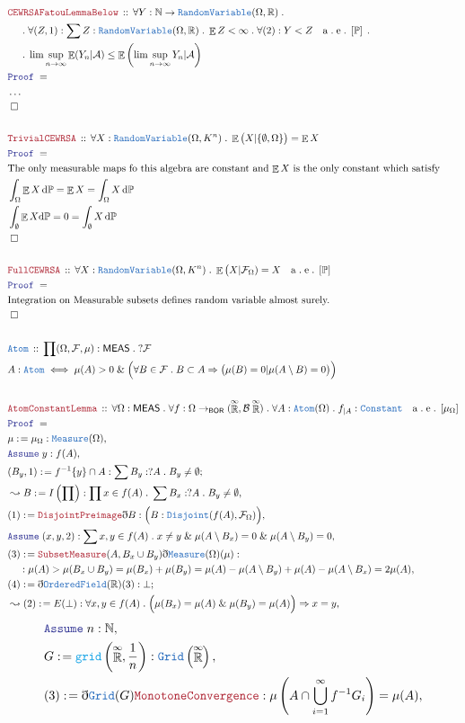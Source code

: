 \documentclass[12pt]{scrartcl}
\newcommand{\TYPE}[1]{\textcolor{NavyBlue}{\mathtt{#1}}}
\newcommand{\FUNC}[1]{\textcolor{Cerulean}{\mathtt{#1}}}
\newcommand{\LOGIC}[1]{\textcolor{Blue}{\mathtt{#1}}}
\newcommand{\THM}[1]{\textcolor{Maroon}{\mathtt{#1}}}
\renewcommand{\.}{\; . \;}
\newcommand{\de}{: \kern 0.1pc =}
\newcommand{\Theorem}[2]{& \THM{#1} \, :: \, #2 \\ & \Proof = \\ }
\newcommand{\DeclareType}[2]{& \TYPE{#1} \, :: \, #2 \\}
\newcommand{\DefineType}[3]{& #1 : \TYPE{#2} \iff #3 \\}
\newcommand{\NewLine}{\\ & \kern 1pc}
\newcommand{\Page}[1]{\begin{align*} #1 \end{align*}   }
\newcommand{ \bd }{ \ByDef }
\newcommand{\NoProof}{ & \ldots \\ \EndProof}
\renewcommand{\And}{\; \& \;}
\newcommand{\Reals}{\mathbb{R} }
\newcommand{\Nat}{\mathbb{N} }
\newcommand{\EReals}{\stackrel{\mathclap{\infty}}{\mathbb{R}}}
\newcommand{\Say}[3]{& #1 \de #2 : #3, \\}
\newcommand{\Conclude}[3]{& #1 \de #2 : #3; \\}
\newcommand{\Derive}[3]{& \leadsto #1 \de #2 : #3, \\}
\newcommand{\A}{\LOGIC{Assume} \;}
\newcommand{\Assume}[2]{& \A #1 : #2, \\}
\newcommand{\QED}{\; \square}
\newcommand{\EndProof}{& \QED \\}
\newcommand{\ByDef}{\eth}
\newcommand{\Proof}{\LOGIC{Proof} \; }
\renewcommand{\AE}[1]{\quad \mathrm{a\. e\.} \left[#1\right] }
\newcommand{\BOR}{\mathsf{BOR}}
\newcommand{\MEAS}{\mathsf{MEAS}}
\newcommand{\F}{\mathcal{F}}
\renewcommand{\O}{\Omega}
\newcommand{\B}{\mathcal{B}}
\renewcommand{\P}{\mathbb{P}}
\newcommand{\RV}{\TYPE{RandomVariable}}
\DeclareMathOperator*{\Exp}{\mathbb{E}}
\begin{document}
\Page{
	\Theorem{CEWRSAFatouLemmaBelow}{
		\forall Y : \Nat \to \RV(\O,\Reals) \. 
		\NewLine \.
		\forall (Z,1) :\sum Z :  \RV(\O,\Reals) \. \Exp Z <  \infty \.  
		\forall (2) : Y < Z \AE{\P} \.
		\NewLine \.
		\lim \sup_{n \to \infty} \Exp(Y_n| \mathcal{A}) \le \Exp\left(\lim \sup_{n \to \infty} Y_n | \mathcal{A}\right)
	}
	\NoProof
	\\
	\Theorem{TrivialCEWRSA}{
		\forall X  : \RV(\O,K^n) \. \Exp\big(X| \{\emptyset,\O\}\big) = \Exp X
	}
	& \textrm{The only measurable maps fo this algebra are constant and $\Exp X$ is the only constant which satisfy} \\
	& \int_\O \Exp X \, \mathrm{d} \P  = \Exp X = \int_\O X \, \mathrm{d} \P \\
	& \int_\emptyset \Exp X \mathrm{d} \P = 0 = \int_\emptyset X \, \mathrm{d} \P \\
	\EndProof
	\\
	\Theorem{FullCEWRSA}{
		\forall X : \RV(\O,K^n) \. \Exp\big(X| \F_\O ) = X \AE{\P}
		}
		& \textrm{Integration on Measurable subsets defines random variable almost surely.} \\
		\EndProof
	\\
	\DeclareType{Atom}{\prod (\O,\F,\mu) : \MEAS \. ?\F}
	\DefineType{A}{Atom}{ \mu(A) > 0 \And \Big(\forall B \in \F \. B \subset A \Rightarrow \big(\mu(B) = 0 | \mu(A\setminus B) = 0 \big)\Big) }
	\\
	\Theorem{AtomConstantLemma}{\forall \O : \MEAS \. \forall f : \O \to_\BOR (\EReals, \B \EReals) \. \forall A : \TYPE{Atom}(\O) \. f_{|A} : \TYPE{Constant} \AE{\mu_\O}}
	\Say{\mu}{\mu_\O}{\TYPE{Measure}(\O)}
	\Assume{y}{f(A)}
	\Conclude{(B_y,1)}{f^{-1}\{y\} \cap A  }{\sum B_y : ?A \. B_y \neq \emptyset}
	\Derive{B}{ I\left(\prod\right)}{ \prod x \in f(A) \. \sum B_x : ?A \. B_y \neq \emptyset }
	\Say{(1)}{\THM{DisjointPreimage}\bd B}{\Big( B : \TYPE{Disjoint}(f(A),\F_\O) \Big)}
	\Assume{(x,y,2)}{\sum x,y \in f(A) \. x \neq y \And \mu(A \setminus B_x) = 0 \And \mu(A \setminus B_y) = 0}
	\Say{(3)}{\THM{SubsetMeasure}(A,B_x\cup B_y)\bd \TYPE{Measure}(\O)(\mu)}{  
		\NewLine :
		\mu(A) > \mu(B_x \cup B_y) = \mu(B_x) + \mu(B_y) = \mu(A) - \mu(A\setminus B_y) + \mu(A) - \mu(A \setminus B_x) =  2\mu(A)   }
	\Conclude{(4)}{ \bd\TYPE{OrderedField}(\Reals)(3) }{\bot}
	\Derive{(2)}{E(\bot)}{\forall x,y \in f(A) \. \Big( \mu(B_x) = \mu(A) \And  \mu(B_y) = \mu(A) \Big) \Rightarrow x = y }
}\Page{
	\Assume{n}{\Nat}
	\Say{G}{\FUNC{grid}\left(\EReals, \frac{1}{n} \right)}{\TYPE{Grid}\left( \EReals \right)}
	\Say{(3)}{ \bd \TYPE{Grid}(G)\THM{MonotoneConvergence} }{ \mu\left( A \cap  \bigcup^\infty_{i=1} f^{-1} G_i   \right) = \mu(A)  }
}
\end{document}
